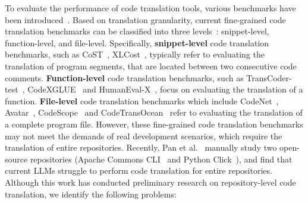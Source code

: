 To evaluate the performance of code translation tools, various benchmarks have been introduced~\cite{Zhu2022CoST,zhu2022xlcost,lachaux2020transcoder,lu2021codexglue,humanevalx,puri2021codenet,ahmad2021avatar,yan2023codescope,yan2023codetransocean}. 
Based on translation granularity, current fine-grained code translation benchmarks can be classified into three levels~\cite{pan2024lost}: 
snippet-level, function-level, and file-level. 
Specifically, \textbf{snippet-level} code translation benchmarks, such as CoST~\cite{Zhu2022CoST}, XLCost~\cite{zhu2022xlcost}, typically refer to evaluating the translation of program segments, that are located between two consecutive code comments.
\textbf{Function-level} code translation benchmarks, such as TransCoder-test~\cite{lachaux2020transcoder}, CodeXGLUE~\cite{lu2021codexglue} and HumanEval-X~\cite{humanevalx}, focus on evaluating the translation of a function. \textbf{File-level} code translation benchmarks which include CodeNet~\cite{puri2021codenet}, Avatar~\cite{ahmad2021avatar}, CodeScope~\cite{yan2023codescope} and CodeTransOcean~\cite{yan2023codetransocean} refer to evaluating the translation of a complete program file.
However, these fine-grained code translation benchmarks may not meet the demands of real development scenarios, which require the translation of entire repositories.
Recently, Pan et al.~\cite{pan2024lost} manually study two open-source repositories (Apache Commons CLI~\cite{apachecommonscli} and Python Click~\cite{click}), and find that current LLMs struggle to perform code translation for entire repositories. 
Although this work has conducted preliminary research on repository-level code translation, we identify the following problems:


